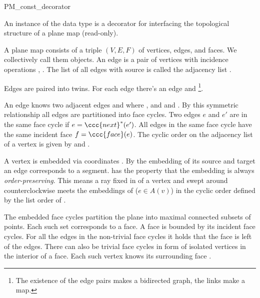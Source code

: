 
\begin{ccRefClass}{PM_const_decorator}


\ccDefinition

An instance  of the data type  is a 
decorator for interfacing the topological structure of a plane map  
(read-only).

A plane map  consists of a triple $(V, E, F)$ of vertices, edges, and
faces. We collectively call them objects. An edge  is a pair of
vertices  with incidence operations , . The list of all edges with source  is called the
adjacency list .

Edges are paired into twins. For each edge  there's an edge
 and \footnote{The existence of 
the edge pairs makes  a bidirected graph, the  links make
 a map.}.

An edge  knows two adjacent edges  and  where ,  and
 and . By this symmetric 
relationship all edges are partitioned into face cycles.  Two edges
$e$ and $e'$ are in the same face cycle if $e = \ccc{next}^*(e')$.  All
edges  in the same face cycle have the same incident face $f =
\ccc{face}(e)$. The cyclic order on the adjacency list of a vertex  is given by  and
.

A vertex  is embedded via coordinates . By the
embedding of its source and target an edge corresponds to a
segment.  has the property that the embedding is always
\emph{order-preserving}.  This means a ray fixed in  of a
vertex  and swept around counterclockwise meets the embeddings of
 ($e \in A(v)$) in the cyclic order defined by the list
order of .

The embedded face cycles partition the plane into maximal connected
subsets of points. Each such set corresponds to a face. A face is
bounded by its incident face cycles. For all the edges in the
non-trivial face cycles it holds that the face is left of the edges.
There can also be trivial face cycles in form of isolated vertices in
the interior of a face. Each such vertex  knows its surrounding
face . 


\end{ccRefClass}
